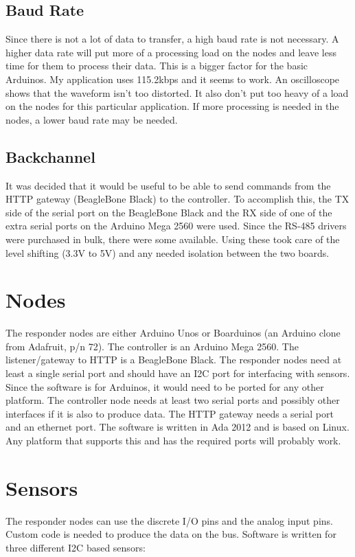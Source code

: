 \documentclass[10pt, openany, draft]{article}
\begin{document}
\subsection{Baud Rate}
Since there is not a lot of data to transfer, a high baud rate is not necessary.  A higher data rate will put more of a processing load on the nodes and leave less time for them to process their data.  This is a bigger factor for the basic Arduinos.  My application uses 115.2kbps and it seems to work.  An oscilloscope shows that the waveform isn't too distorted.  It also don't put too heavy of a load on the nodes for this particular application.  If more processing is needed in the nodes, a lower baud rate may be needed.

\subsection{Backchannel}
It was decided that it would be useful to be able to send commands from the HTTP gateway (BeagleBone Black) to the controller.  To accomplish this, the TX side of the serial port on the BeagleBone Black and the RX side of one of the extra serial ports on the Arduino Mega 2560 were used.  Since the RS-485 drivers were purchased in bulk, there were some available.  Using these took care of the level shifting (3.3V to 5V) and any needed isolation between the two boards.

\section{Nodes}
The responder nodes are either Arduino Unos or Boarduinos (an Arduino clone from Adafruit, p/n 72).  The controller is an Arduino Mega 2560.  The listener/gateway to HTTP is a BeagleBone Black.  The responder nodes need at least a single serial port and should have an I2C port for interfacing with sensors.  Since the software is for Arduinos, it would need to be ported for any other platform.  The controller node needs at least two serial ports and possibly other interfaces if it is also to produce data.  The HTTP gateway needs a serial port and an ethernet port.  The software is written in Ada 2012 and is based on Linux.  Any platform that supports this and has the required ports will probably work.

\section{Sensors}
The responder nodes can use the discrete I/O pins and the analog input pins.  Custom code is needed to produce the data on the bus.  Software is written for three different I2C based sensors:
\end{document}
